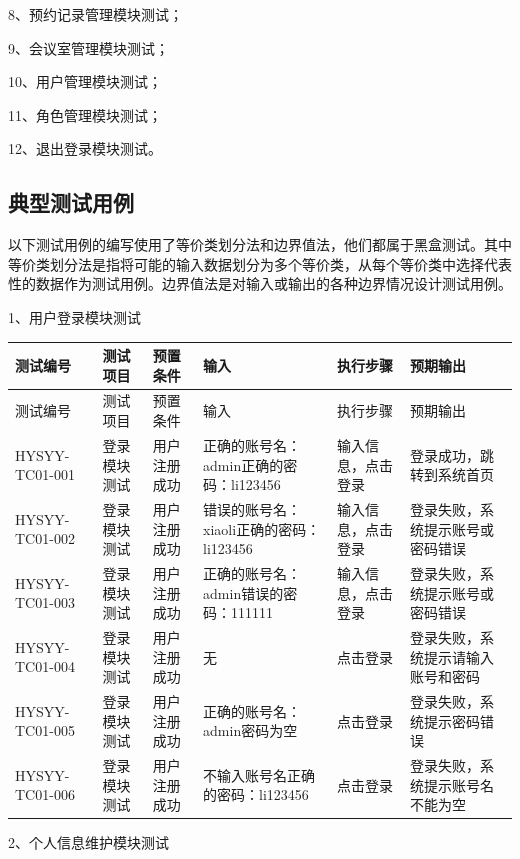 \documentclass{izdthesis}
\begin{document}
8、预约记录管理模块测试；

9、会议室管理模块测试；

10、用户管理模块测试；

11、角色管理模块测试；

12、退出登录模块测试。

\subsection{典型测试用例}
以下测试用例的编写使用了等价类划分法和边界值法，他们都属于黑盒测试。其中等价类划分法是指将可能的输入数据划分为多个等价类，从每个等价类中选择代表性的数据作为测试用例。边界值法是对输入或输出的各种边界情况设计测试用例。

1、用户登录模块测试

{\songti
\begin{longtable}{|p{2.3cm}|p{1.8cm}|p{1.9cm}|p{3.2cm}|p{2.1cm}|p{2.3cm}|}
  \hline
  测试编号 & 测试项目 & 预置条件 & 输入 & 执行步骤 & 预期输出 \\
  \hline
  \endfirsthead
  \hline
  测试编号 & 测试项目 & 预置条件 & 输入 & 执行步骤 & 预期输出 \\
  \hline
  \endhead
  HYSYY-TC01-001 & 登录模块测试 & 用户注册成功 & 正确的账号名：admin正确的密码：li123456 & 输入信息，点击登录 & 登录成功，跳转到系统首页 \\
  \hline
  HYSYY-TC01-002 & 登录模块测试 & 用户注册成功 & 错误的账号名：xiaoli正确的密码：li123456 & 输入信息，点击登录 & 登录失败，系统提示账号或密码错误 \\
  \hline
  HYSYY-TC01-003 & 登录模块测试 & 用户注册成功 & 正确的账号名：admin错误的密码：111111 & 输入信息，点击登录 & 登录失败，系统提示账号或密码错误 \\
  \hline
  HYSYY-TC01-004 & 登录模块测试 & 用户注册成功 & 无 & 点击登录 & 登录失败，系统提示请输入账号和密码 \\
  \hline
  HYSYY-TC01-005 & 登录模块测试 & 用户注册成功 & 正确的账号名：admin密码为空 & 点击登录 & 登录失败，系统提示密码错误 \\
  \hline
  HYSYY-TC01-006 & 登录模块测试 & 用户注册成功 & 不输入账号名正确的密码：li123456 & 点击登录 & 登录失败，系统提示账号名不能为空 \\
  \hline
\end{longtable}
}

2、个人信息维护模块测试
\end{document}
